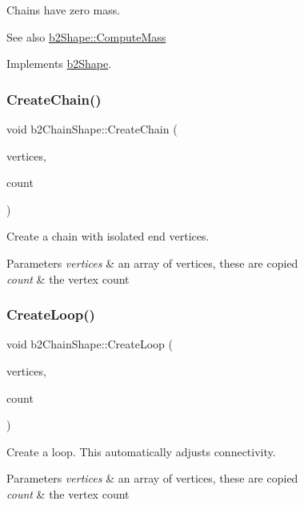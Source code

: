 Chains have zero mass. \begin{DoxySeeAlso}{See also}
\hyperlink{classb2_shape_a61b365526241b47f124789b0309cac69}{b2\+Shape\+::\+Compute\+Mass} 
\end{DoxySeeAlso}


Implements \hyperlink{classb2_shape_a61b365526241b47f124789b0309cac69}{b2\+Shape}.

\mbox{\label{classb2_chain_shape_aa0977339b743c05f2179939ccc38e7e0}} 
\subsubsection{\texorpdfstring{Create\+Chain()}{CreateChain()}}
{\footnotesize\ttfamily void b2\+Chain\+Shape\+::\+Create\+Chain (\begin{DoxyParamCaption}\item[{const \hyperlink{structb2_vec2}{b2\+Vec2} $\ast$}]{vertices,  }\item[{int32}]{count }\end{DoxyParamCaption})}

Create a chain with isolated end vertices. 
\begin{DoxyParams}{Parameters}
{\em vertices} & an array of vertices, these are copied \\
\hline
{\em count} & the vertex count \\
\hline
\end{DoxyParams}
\mbox{\label{classb2_chain_shape_ac257742a52cac391e25962a4c703fb06}} 
\subsubsection{\texorpdfstring{Create\+Loop()}{CreateLoop()}}
{\footnotesize\ttfamily void b2\+Chain\+Shape\+::\+Create\+Loop (\begin{DoxyParamCaption}\item[{const \hyperlink{structb2_vec2}{b2\+Vec2} $\ast$}]{vertices,  }\item[{int32}]{count }\end{DoxyParamCaption})}

Create a loop. This automatically adjusts connectivity. 
\begin{DoxyParams}{Parameters}
{\em vertices} & an array of vertices, these are copied \\
\hline
{\em count} & the vertex count \\
\hline
\end{DoxyParams}
\mbox{\label{classb2_chain_shape_a4d4fd8f5386a30f35b10d1b2848dbe54}} 
